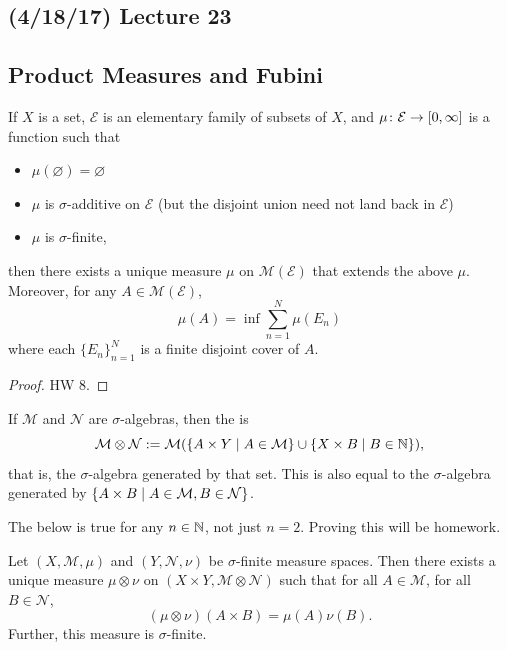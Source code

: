\documentclass[11pt,leqno,oneside]{amsbook}
\numberwithin{thm}{section}
\newcommand{\M}{\mathcal{M}}
\newcommand{\E}{\mathcal{E}}
\newcommand{\cN}{\mathcal{N}}
\newcommand{\s}{$\sigma$-} %
\newcommand{\x}{\times}
\newcommand{\ox}{\otimes}
\renewcommand{\emptyset}{\varnothing}
\begin{document}
\subsection*{(4/18/17) Lecture 23}
\subsection{Product Measures and Fubini}
\begin{thm}
  If $X$ is a set, $\E$ is an elementary family of subsets of $X$, and $\mu \from \E \to [0, \oo]$ is a function such that
  \begin{itemize}
    \item $\mu(\emptyset) = \emptyset$
    \item $\mu$ is \s additive on $\E$ (but the disjoint union need not land back in $\E$)
    \item $\mu$ is \s finite,
  \end{itemize}
  then there exists a unique measure $\mu$ on $\M(\E)$ that extends the above $\mu$.  Moreover, for any $A \in \M(\E)$, $$\mu(A) = \inf\sum_{n=1}^N \mu(E_n)$$ where each $\{E_n\}_{n=1}^N$ is a finite disjoint cover of $A$.
\end{thm}
\begin{proof}
  HW 8.
\end{proof}
\begin{defn}
  If $\M$ and $\cN$ are \s algebras, then the \de{product \s algebra} is $$\M \ox \cN := \M(\{A \x Y \st A \in \M\}\union\{X \x B \st B \in \N\}),$$ that is, the \s algebra generated by that set.  This is also equal to the \s algebra generated by $\{A \x B \st A \in \M, B \in \cN\}$.
\end{defn}
\begin{thm}
  The below is true for any $n \in {\mathbb N}$, not just $n = 2$.  Proving this will be homework.
\end{thm}
\begin{thm}
  Let $(X, \M, \mu)$ and $(Y, \cN, \nu)$ be \s finite measure spaces.
  Then there exists a unique measure $\mu \ox \nu$ on $(X \x Y, \M \ox
  \cN)$ such that for all $A \in \M$, for all $B \in \cN$, $$(\mu \ox \nu)(A \x B) = \mu(A)\nu(B).$$  Further, this measure is \s finite.
\end{thm}
\end{document}
